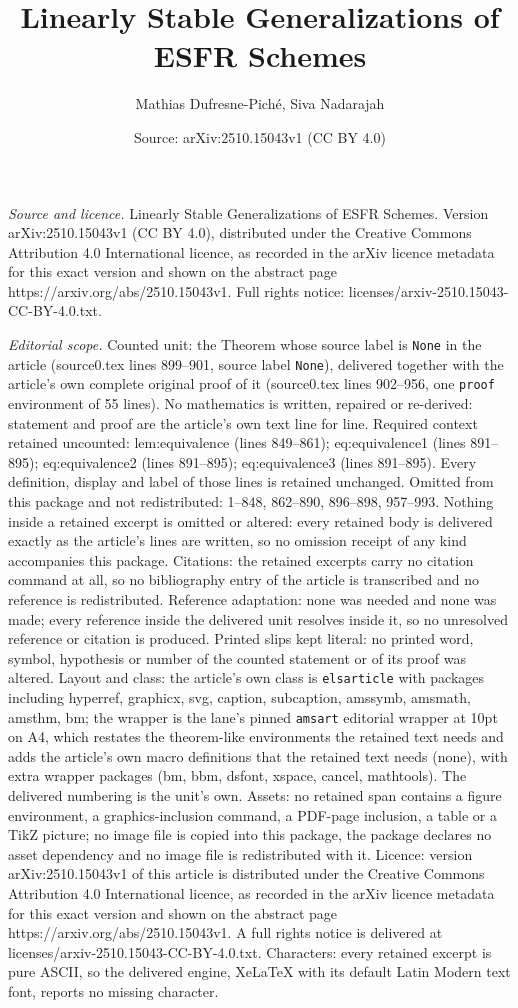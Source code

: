 \documentclass[10pt,a4paper]{amsart}
\title[Linearly Stable Generalizations of ESFR Schemes]{Linearly Stable Generalizations of ESFR Schemes}
\author{Mathias Dufresne-Pich\'e, Siva Nadarajah}
\date{Source: arXiv:2510.15043v1 (CC BY 4.0)}
\begin{document}
\maketitle

\noindent\emph{Source and licence.} Linearly Stable Generalizations of ESFR Schemes. Version arXiv:2510.15043v1 (CC BY 4.0), distributed under the Creative Commons Attribution 4.0 International licence, as recorded in the arXiv licence metadata for this exact version and shown on the abstract page https://arxiv.org/abs/2510.15043v1. Full rights notice: licenses/arxiv-2510.15043-CC-BY-4.0.txt.\par\smallskip

\noindent\textit{Editorial scope.} Counted unit: the Theorem whose source label is \texttt{None} in the article (source0.tex lines 899--901, source label \texttt{None}), delivered together with the article's own complete original proof of it (source0.tex lines 902--956, one \texttt{proof} environment of 55 lines). No mathematics is written, repaired or re-derived: statement and proof are the article's own text line for line. Required context retained uncounted: lem:equivalence (lines 849--861); eq:equivalence1 (lines 891--895); eq:equivalence2 (lines 891--895); eq:equivalence3 (lines 891--895). Every definition, display and label of those lines is retained unchanged. Omitted from this package and not redistributed: 1--848, 862--890, 896--898, 957--993. Nothing inside a retained excerpt is omitted or altered: every retained body is delivered exactly as the article's lines are written, so no omission receipt of any kind accompanies this package. Citations: the retained excerpts carry no citation command at all, so no bibliography entry of the article is transcribed and no reference is redistributed. Reference adaptation: none was needed and none was made; every reference inside the delivered unit resolves inside it, so no unresolved reference or citation is produced. Printed slips kept literal: no printed word, symbol, hypothesis or number of the counted statement or of its proof was altered. Layout and class: the article's own class is \texttt{elsarticle} with packages including hyperref, graphicx, svg, caption, subcaption, amssymb, amsmath, amsthm, bm; the wrapper is the lane's pinned \texttt{amsart} editorial wrapper at 10pt on A4, which restates the theorem-like environments the retained text needs and adds the article's own macro definitions that the retained text needs (none), with extra wrapper packages (bm, bbm, dsfont, xspace, cancel, mathtools). The delivered numbering is the unit's own. Assets: no retained span contains a figure environment, a graphics-inclusion command, a PDF-page inclusion, a table or a TikZ picture; no image file is copied into this package, the package declares no asset dependency and no image file is redistributed with it. Licence: version arXiv:2510.15043v1 of this article is distributed under the Creative Commons Attribution 4.0 International licence, as recorded in the arXiv licence metadata for this exact version and shown on the abstract page https://arxiv.org/abs/2510.15043v1. A full rights notice is delivered at licenses/arxiv-2510.15043-CC-BY-4.0.txt. Characters: every retained excerpt is pure ASCII, so the delivered engine, XeLaTeX with its default Latin Modern text font, reports no missing character.
\end{document}

